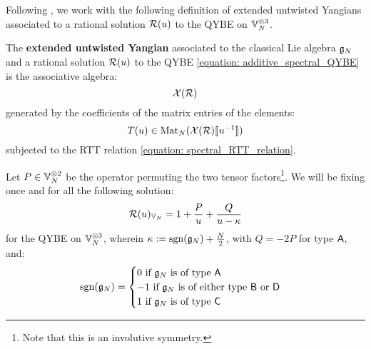         Following \cite[Definition 2.1]{guay_regelskis_twisted_yangians_for_symmetric_pairs_of_types_BCD}, we work with the following definition of extended untwisted Yangians associated to a rational solution $\mathcal{R}(u)$ to the QYBE on $\bbV_N^{\tensor 3}$.
        \begin{definition} \label{def: extended_untwisted_yangians}
            The \textbf{extended untwisted Yangian} associated to the classical Lie algebra $\mathfrak{g}_N$ and a rational solution $\mathcal{R}(u)$ to the QYBE \eqref{equation: additive_spectral_QYBE} is the associative algebra:
                $$\mathcal{X}(\mathcal{R})$$
            generated by the coefficients of the matrix entries of the elements:
                $$T(u) \in \operatorname{Mat}_N( \mathcal{X}(\mathcal{R})[\![u^{-1}]\!] )$$
            subjected to the RTT relation \eqref{equation: spectral_RTT_relation}.
        \end{definition}
    
        Let $P \in \bbV_N^{\tensor 2}$ be the operator permuting the two tensor factors\footnote{Note that this is an involutive symmetry.}. We will be fixing once and for all the following solution:
            $$\mathcal{R}(u)_{\mathbb{V}_N} = 1 + \frac{P}{u} + \frac{Q}{u - \kappa}$$
        for the QYBE on $\bbV_N^{\tensor 3}$, wherein $\kappa := \operatorname{sgn}(\mathfrak{g}_N) + \frac{N}{2}$, with $Q = -2P$ for type $\mathsf{A}$, and:
            \begin{equation} \label{equation: ABCD_signature}
                \operatorname{sgn}(\mathfrak{g}_N) =
                \begin{cases}
                    \text{$0$ if $\mathfrak{g}_N$ is of type $\mathsf{A}$}
                    \\
                    \text{$-1$ if $\mathfrak{g}_N$ is of either type $\mathsf{B}$ or $\mathsf{D}$}
                    \\
                    \text{$1$ if $\mathfrak{g}_N$ is of type $\mathsf{C}$}
                \end{cases}
            \end{equation}
    
